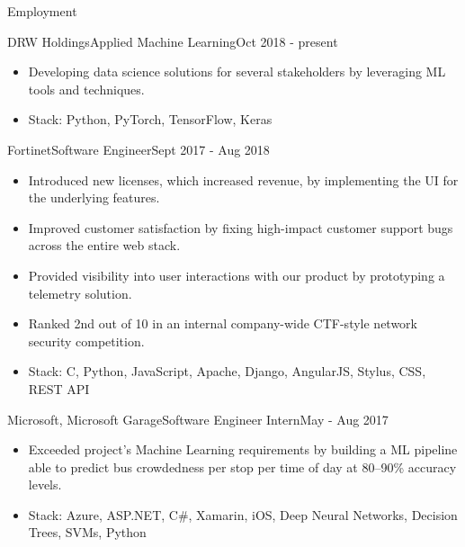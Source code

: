 \documentclass[]{muchicv}
\begin{document}
	\makeheader
	
	\begin{cvsection}{Employment}
			\begin{cvsubsection}{DRW Holdings}{Applied Machine Learning}{Oct 2018 - present}
			\begin{itemize}
				\item Developing data science solutions for several stakeholders by leveraging ML tools and techniques.
				\item Stack: Python, PyTorch, TensorFlow, Keras
			\end{itemize}
		\end{cvsubsection}
	
		\begin{cvsubsection}{Fortinet}{Software Engineer}{Sept 2017 - Aug 2018}
			\begin{itemize}
				\item Introduced new licenses, which increased revenue, by implementing the UI for the underlying features.
				\item Improved customer satisfaction by fixing high-impact customer support bugs across the entire web stack.
				\item Provided visibility into user interactions with our product by prototyping a telemetry solution.
				\item Ranked 2nd out of 10 in an internal company-wide CTF-style network security competition.
				\item Stack: C, Python, JavaScript, Apache, Django, AngularJS, Stylus, CSS, REST API
			\end{itemize}
		\end{cvsubsection}
		
		\begin{cvsubsection}{Microsoft, Microsoft Garage}{Software Engineer Intern}{May - Aug 2017}
			\begin{itemize}
				\item Exceeded project's Machine Learning requirements by building a ML pipeline able to predict bus crowdedness per stop per time of day at 80--90\% accuracy levels.
				\item Stack: Azure, ASP.NET, C\#, Xamarin, iOS, Deep Neural Networks, Decision Trees, SVMs, Python
			\end{itemize}
		\end{cvsubsection}
		

\end{cvsection}
\end{document}
